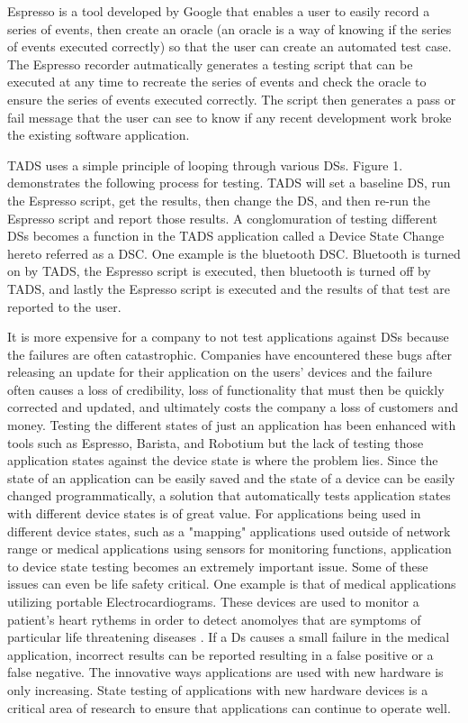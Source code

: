 Espresso is a tool developed by Google that enables a user to easily record a series of events, then create an oracle (an oracle is a way of knowing if the series of events executed correctly) so that the user can create an automated test case.  The Espresso recorder autmatically generates a testing script that can be executed at any time to recreate the series of events and check the oracle to ensure the series of events executed correctly.  The script then generates a pass or fail message that the user can see to know if any recent development work broke the existing software application. 

TADS uses a simple principle of looping through various DSs.  Figure 1. demonstrates the following process for testing. TADS will set a baseline DS, run the Espresso script, get the results, then change the DS, and then re-run the Espresso script and report those results.  A conglomuration of testing different DSs becomes a function in the TADS application called a Device State Change hereto referred as a DSC.  One example is the bluetooth DSC.  Bluetooth is turned on by TADS, the Espresso script is executed, then bluetooth is turned off by TADS, and lastly the Espresso script is executed and the results of that test are reported to the user.

It is more expensive for a company to not test applications against DSs because the failures are often catastrophic.  Companies have encountered these bugs after releasing an update for their application on the users' devices and the failure often causes a loss of credibility, loss of functionality that must then be quickly corrected and updated, and ultimately costs the company a loss of customers and money.  Testing the different states of just an application has been enhanced with tools such as Espresso, Barista, and Robotium \cite{optimusinformationinc2016} but the lack of testing those application states against the device state is where the problem lies.  Since the state of an application can be easily saved and the state of a device can be easily changed programmatically, a solution that automatically tests application states with different device states is of great value.  For applications being used in different device states, such as a "mapping" applications used outside of network range or medical applications using sensors for monitoring functions, application to device state testing becomes an extremely important issue.  Some of these issues can even be life safety critical.  One example is that of medical applications utilizing portable Electrocardiograms.  These devices are used to monitor a patient's heart rythems in order to detect anomolyes that are symptoms of particular life threatening diseases \cite{boulos2014mobile}.  If a Ds causes a small failure in the medical application, incorrect results can be reported resulting in a false positive or a false negative.  The innovative ways applications are used with new hardware is only increasing.  State testing of applications with new hardware devices is a critical area of research to ensure that applications can continue to operate well. 

